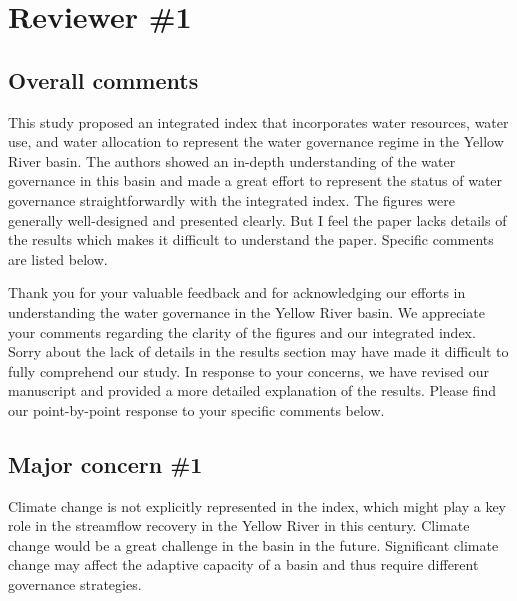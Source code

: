 \section{Reviewer \#1}\label{reviewer_1}

\subsection*{Overall comments} %

\RC{} This study proposed an integrated index that incorporates water resources, water use, and water allocation to represent the water governance regime in the Yellow River basin. The authors showed an in-depth understanding of the water governance in this basin and made a great effort to represent the status of water governance straightforwardly with the integrated index. The figures were generally well-designed and presented clearly. But I feel the paper lacks details of the results which makes it difficult to understand the paper. Specific comments are listed below.

\AR{} Thank you for your valuable feedback and for acknowledging our efforts in understanding the water governance in the Yellow River basin. We appreciate your comments regarding the clarity of the figures and our integrated index. Sorry about the lack of details in the results section may have made it difficult to fully comprehend our study. In response to your concerns, we have revised our manuscript and provided a more detailed explanation of the results. Please find our point-by-point response to your specific comments below.

\subsection{Major concern \#1}

\RC{} Climate change is not explicitly represented in the index, which might play a key role in the streamflow recovery in the Yellow River in this century. Climate change would be a great challenge in the basin in the future. Significant climate change may affect the adaptive capacity of a basin and thus require different governance strategies.

